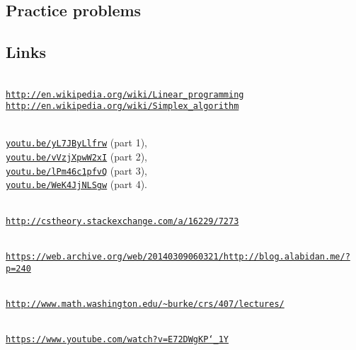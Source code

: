 \documentclass[11pt,oneside]{article}
\begin{document}
	\subsection{Practice problems}

		



	\subsection{Links}

		 \\
		\href{http://en.wikipedia.org/wiki/Linear_programming}{\texttt{http://en.wikipedia.org/wiki/Linear\_programming}} \\ 
		\href{http://en.wikipedia.org/wiki/Simplex_algorithm}{\texttt{http://en.wikipedia.org/wiki/Simplex\_algorithm}}

		\medskip
		 \\
		\href{https://youtu.be/yL7JByLlfrw} 
			{\texttt{youtu.be/yL7JByLlfrw}} (part 1), \\
		\href{https://youtu.be/vVzjXpwW2xI}
			{\texttt{youtu.be/vVzjXpwW2xI}} (part 2), \\
		\href{https://youtu.be/lPm46c1pfvQ}
			{\texttt{youtu.be/lPm46c1pfvQ}} (part 3),  \\
		\href{https://youtu.be/WeK4JjNLSgw}
			{\texttt{youtu.be/WeK4JjNLSgw}} (part 4).



		\medskip
		 \\
		\href{http://cstheory.stackexchange.com/a/16229/7273}
			{\texttt{http://cstheory.stackexchange.com/a/16229/7273}}

		\medskip
		 \\ 
		\href{https://web.archive.org/web/20140309060321/http://blog.alabidan.me/?p=240}
			{\texttt{https://web.archive.org/web/20140309060321/http://blog.alabidan.me/?p=240}}

		\medskip
		 \\
		\href{http://www.math.washington.edu/~burke/crs/407/lectures/}
	            {\texttt{http://www.math.washington.edu/\textasciitilde{}burke/crs/407/lectures/}}

		\medskip
		 \\
		\href{https://www.youtube.com/watch?v=E72DWgKP_1Y}
	            {\texttt{https://www.youtube.com/watch?v=E72DWgKP\char`_1Y}}
\end{document}
